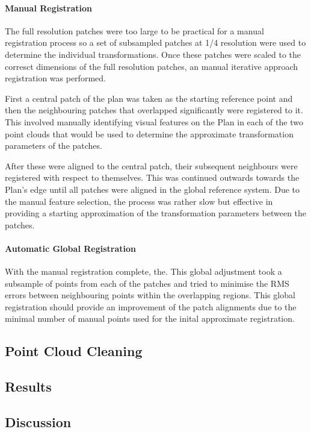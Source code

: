 		\paragraph{Manual Registration}
		The full resolution patches were too large to be practical for a manual registration process so a set of subsampled patches at 1/4 resolution were used to determine the individual transformations. Once these patches were scaled to the corresct dimensions of the full resolution patches, an manual iterative approach registration was performed. 
		
		First a central patch of the plan was taken as the starting reference point and then the neighbouring patches that overlapped significantly were registered to it. This involved manually identifying visual features on the Plan in each of the two point clouds that would be used to determine the approximate transformation parameters of the patches.
		
		After these were aligned to the central patch, their subsequent neighbours were registered with respect to themselves. This was continued outwards towards the Plan's edge until all patches were aligned in the global reference system. Due to the manual feature selection, the process was rather slow but effective in providing a starting approximation of the transformation parameters between the patches.
	
		\paragraph{Automatic Global Registration}
		With the manual registration complete, the. This global adjustment took a subsample of points from each of the patches and tried to minimise the RMS errors between neighbouring points within the overlapping regions. This global registration should provide an improvement of the patch alignments due to the minimal number of manual points used for the inital approximate registration.
	
	\subsection{Point Cloud Cleaning}
	\label{sec:PointCloudCleaning}
	
	\subsection{Results}
	\label{sec:ResultsPtClouds}
	
	\subsection{Discussion}
	\label{sec:DiscussionPtClouds}